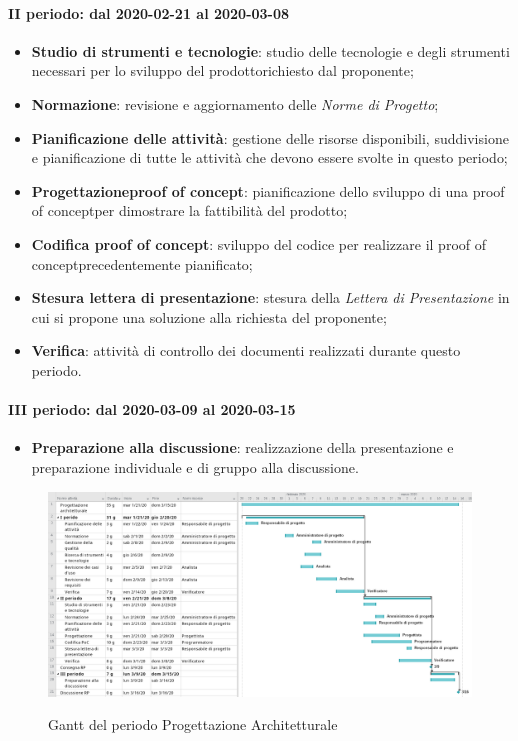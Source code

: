 \paragraph*{II periodo: dal 2020-02-21 al 2020-03-08}
\begin{itemize}
	\item \textbf{Studio di strumenti e tecnologie}: studio delle tecnologie e degli strumenti necessari per lo sviluppo del prodotto\glosp richiesto dal proponente;
	\item \textbf{Normazione}: revisione e aggiornamento delle \textit{Norme di Progetto};
	\item \textbf{Pianificazione delle attività}: gestione delle risorse disponibili, suddivisione e pianificazione di tutte le attività che devono essere svolte in questo periodo;
	\item \textbf{Progettazione}\glosp\textbf{proof of concept}\glo: pianificazione dello sviluppo di una proof of concept\glosp per dimostrare la fattibilità del prodotto\glo;
	\item \textbf{Codifica proof of concept}\glo: sviluppo del codice per realizzare il proof of concept\glosp precedentemente pianificato;
	\item \textbf{Stesura lettera di presentazione}: stesura della \textit{Lettera di Presentazione} in cui si propone una soluzione alla richiesta del proponente;
	\item \textbf{Verifica}: attività di controllo dei documenti realizzati durante questo periodo.
\end{itemize}

\paragraph*{III periodo: dal 2020-03-09 al 2020-03-15}
\begin{itemize}
	\item \textbf{Preparazione alla discussione}: realizzazione della presentazione e preparazione individuale e di gruppo alla discussione.
\end{itemize}

\begin{landscape}
	\begin{figure}[H] 	
		\includegraphics[width=\linewidth]{./gantt/Progettazione_architetturale_datax2.png}	\\
		\caption{Gantt del periodo Progettazione Architetturale}	
	\end{figure}
\end{landscape}


